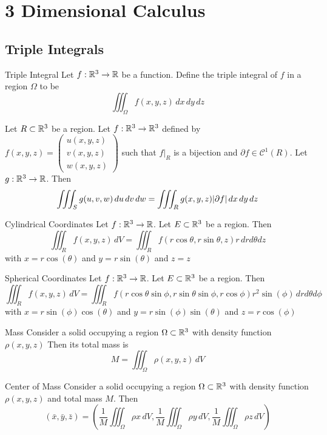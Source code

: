 \documentclass[a4paper]{article}
\begin{document}
\pagebreak

\section{3 Dimensional Calculus}
\subsection{Triple Integrals}
\begin{defn}{Triple Integral}{} Let $f:\mathbb{R}^3\to\mathbb{R}$ be a function. Define the triple integral of $f$ in a region $\Omega$ to be $$\iiint_\Omega f(x,y,z)\,dx\,dy\,dz$$
\end{defn}

\begin{thm}{}{}Let $R\subset\mathbb{R}^3$ be a region. Let $f:\mathbb{R}^3\to\mathbb{R}^3$ defined by $f(x,y,z)=\begin{pmatrix}u(x,y,z)\\v(x,y,z)\\w(x,y,z)\end{pmatrix}$ such that $f|_R$ is a bijection and $\partial f\in\mathcal{C}^1(R)$. Let $g:\mathbb{R}^3\to\mathbb{R}$. Then $$\iiint_Sg(u,v,w)\,du\,dv\,dw=\iiint_Rg(x,y,z)\abs{\partial f}\,dx\,dy\,dz$$
\end{thm}

\begin{thm}{Cylindrical Coordinates}{} Let $f:\mathbb{R}^3\to\mathbb{R}$. Let $E\subset\mathbb{R}^3$ be a region. Then $$\iiint_R f(x,y,z)\,dV=\iiint_R f(r\cos\theta,r\sin\theta,z)r\,drd\theta dz$$ with $x=r\cos(\theta)$ and $y=r\sin(\theta)$ and $z=z$
\end{thm}

\begin{thm}{Spherical Coordinates}{} Let $f:\mathbb{R}^3\to\mathbb{R}$. Let $E\subset\mathbb{R}^3$ be a region. Then $$\iiint_R f(x,y,z)\,dV=\iiint_R f(r\cos\theta\sin\phi,r\sin\theta\sin\phi,r\cos\phi)r^2\sin(\phi)\,drd\theta d\phi$$ with $x=r\sin(\phi)\cos(\theta)$ and $y=r\sin(\phi)\sin(\theta)$ and $z=r\cos(\phi)$
\end{thm}

\begin{thm}{Mass}{} Consider a solid occupying a region $\Omega\subset\mathbb{R}^3$ with density function $\rho(x,y,z)$ Then its total mass is $$M=\iiint_\Omega\rho(x,y,z)\,dV$$
\end{thm}

\begin{thm}{Center of Mass}{} Consider a solid occupying a region $\Omega\subset\mathbb{R}^3$ with density function $\rho(x,y,z)$ and total mass $M$. Then $$(\bar{x},\bar{y},\bar{z})=\left(\frac{1}{M}\iiint_\Omega\rho x\,dV, \frac{1}{M}\iiint_\Omega\rho y\,dV, \frac{1}{M}\iiint_\Omega\rho z\,dV\right)$$
\end{thm}
\end{document}
